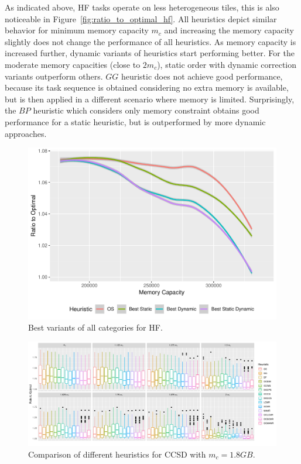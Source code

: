 \documentclass[sigconf]{acmart}
\begin{document}
{		
		As indicated above, HF tasks operate on less heterogeneous tiles, this is also noticeable in Figure~\ref{fig:ratio_to_optimal_hf}. All heuristics depict similar behavior for minimum memory capacity $m_c$ and increasing the memory capacity slightly does not change the performance of all heuristics. As memory capacity is increased further, dynamic variants of heuristics start performing better. For the moderate memory capacities (close to $2m_c$), static order with dynamic correction variants outperform others. $GG$ heuristic does not achieve good performance, because its task sequence is obtained considering no extra memory is available, but is then applied in a different scenario where memory is limited. Surprisingly, the $BP$ heuristic which considers only memory constraint obtains good performance for a static heuristic, but is outperformed by more dynamic approaches.
	\begin{figure}[!tb]
	\includegraphics[scale=0.5]{./results/ratio_to_optimal_hf-best.pdf}
	\vspace*{-0.85cm}\caption{Best variants of all categories for HF.\vspace*{-0.8cm}}
	\label{fig:ratio_to_optimal_best_hf}
\end{figure}

\begin{figure}[htb]
	\includegraphics[scale=0.5]{./results/ratio_to_optimal_selected_ccsd.pdf}
	\vspace*{-0.95cm}\caption{Comparison of different heuristics for CCSD with $m_c=1.8GB$.\vspace*{-0.15cm}}
	\label{fig:ratio_to_optimal_ccsd}
\end{figure}	




}
\end{document}
